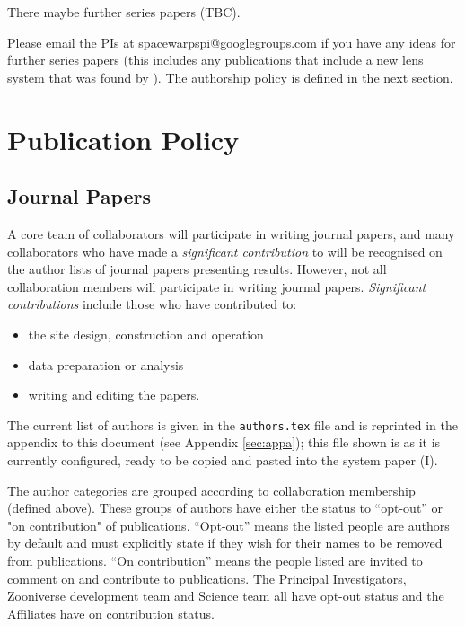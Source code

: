 \documentclass[a4paper]{article}
\begin{document}
There maybe further series papers (TBC).\newline


Please email the \sw PIs at spacewarpspi@googlegroups.com if you have any ideas for further \sw series papers (this includes any publications that include a new lens system that was found by \sw). The authorship policy is defined in the next section.


\section{Publication Policy}
\label{sec:publ}

\subsection{Journal Papers}
\label{sec:series}
A core team of collaborators will participate in writing journal papers, and many collaborators who have made a \textit{significant contribution} to \sw will be recognised on the author
lists of journal papers presenting \sw results.  However, not all collaboration members will participate in writing journal papers.  \textit{Significant contributions} include those who have contributed to:
\begin{itemize}
\item the site design, construction and operation
\item data preparation or analysis
\item writing and editing the papers. 
\end{itemize}


The current list of \sw authors is given in the \texttt{authors.tex} file and is reprinted
in the appendix to this document (see Appendix \ref{sec:appa}); this file shown is as it is currently configured, ready to be copied and pasted into the \sw system paper (\sw I). 

\noindent The author categories are grouped according to collaboration membership (defined above). These groups of authors have either the status to ``opt-out'' or "on contribution" of \sw publications.  ``Opt-out'' means the listed people are authors by default and must explicitly state if they wish for their names to be removed from \sw publications. ``On contribution'' means the people listed are invited to comment on and contribute to publications. The Principal Investigators, Zooniverse development team and \sw Science team all have opt-out status and the \sw Affiliates have on contribution status.
\end{document}
